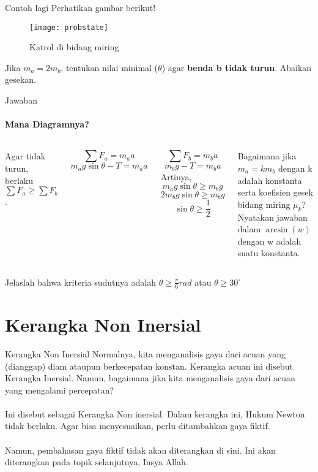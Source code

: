 \documentclass[10pt,aspectratio=54, handout]{beamer}
\begin{document}
   \begin{frame}{Contoh lagi}
     Perhatikan gambar berikut!
     \begin{figure}[!h]
     \begin{center}
         \texttt{[image: probstate]}
         \caption{Katrol di bidang miring}
     \end{center}
     \end{figure}
     
     Jika $m_a=2m_b$, tentukan nilai minimal ($\theta$) agar \textbf{benda b tidak turun}. Abaikan gesekan.
   \end{frame}
   
   
   \begin{frame}{Jawaban}
   
   \framesubtitle{Mana Diagramnya?}
   \begin{columns}[c]
     
   
   

   
     Agar tidak turun, berlaku
     $\sum{F_a}\geq \sum{F_b}$.
     
     $$\sum{F_a}=m_a a$$
     $$m_a g\sin\theta-T = m_a a$$
     
     $$\sum{F_b}=m_b a$$
     $$m_b g-T = m_b a$$
     Artinya,
     $$m_a g\sin\theta \geq m_b g$$
     $$2m_b g\sin\theta \geq m_b g$$
     $$\sin\theta \geq \frac{1}{2}$$
     
     \begin{block}{}
       Bagaimana jika $m_a=km_b$ dengan k adalah konstanta serta koefisien gesek bidang miring $\mu_k$? Nyatakan jawaban dalam $\arcsin(w)$ dengan w adalah suatu konstanta.
     \end{block}
     
     
    \end{columns}
     
     Jelaslah bahwa kriteria sudutnya adalah $\boxed{\theta \geq \frac{\pi}{6}\unit{rad}}$ atau $\boxed{\theta \geq 30^\circ}$
   \end{frame}
   
   
   \section{Kerangka Non Inersial}
   \label{sec:Gaya Fiktif}
   
   \begin{frame}{Kerangka Non Inersial}
     Normalnya, kita menganalisis gaya dari acuan yang (dianggap) diam ataupun berkecepatan konstan. Kerangka acuan ini disebut Kerangka Inersial. Namun, bagaimana jika kita menganalisis gaya dari acuan yang mengalami percepatan?\\~\\
     
     Ini disebut sebagai Kerangka Non inersial. Dalam kerangka ini, Hukum Newton tidak berlaku. Agar bisa menyesuaikan, perlu ditambahkan gaya fiktif. \\~\\
     Namun, pembahasan gaya fiktif tidak akan diterangkan di sini. Ini akan diterangkan pada topik selanjutnya, Insya Allah.
   \end{frame}
   
\end{document}
